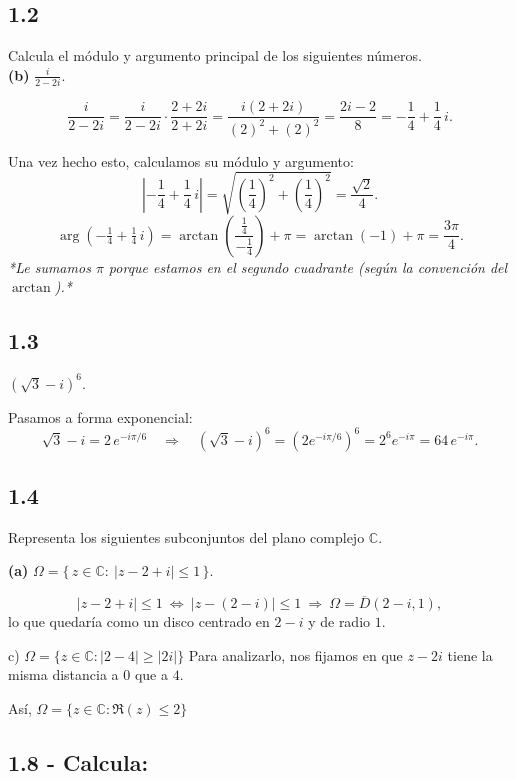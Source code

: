 \documentclass[a4paper,12pt]{article}
\begin{document}
\subsection*{1.2} Calcula el módulo y argumento principal de los siguientes números.\\[2pt]
\noindent\textbf{(b)} \(\displaystyle \frac{i}{2-2i}\).

\[
\frac{i}{2-2i}
=\frac{i}{2-2i}\cdot\frac{2+2i}{2+2i}
=\frac{i(2+2i)}{(2)^{2}+(2)^{2}}
=\frac{2i-2}{8}
=-\frac{1}{4}+\frac{1}{4}\,i .
\]

Una vez hecho esto, calculamos su módulo y argumento:
\[
\left|-\frac14+\frac14\,i\right|
=\sqrt{\left(\frac14\right)^{2}+\left(\frac14\right)^{2}}
=\frac{\sqrt2}{4}.
\]
\[
\arg\!\left(-\tfrac14+\tfrac14\,i\right)
=\arctan\!\left(\frac{\,\tfrac14\,}{-\tfrac14}\right)+\pi
=\arctan(-1)+\pi=\frac{3\pi}{4}.
\]
\emph{*Le sumamos \(\pi\) porque estamos en el segundo cuadrante (según la convención del \(\arctan\)).*}

\subsection*{1.3} \(\displaystyle (\sqrt{3}-i)^{6}\).

Pasamos a forma exponencial:
\[
\sqrt{3}-i=2\,e^{-i\pi/6}
\quad\Longrightarrow\quad
(\sqrt{3}-i)^{6}=(2e^{-i\pi/6})^{6}=2^{6}e^{-i\pi}=64\,e^{-i\pi}.
\]

\subsection*{1.4} Representa los siguientes subconjuntos del plano complejo \(\mathbb{C}\).

\noindent\textbf{(a)} \(\displaystyle \Omega=\{\,z\in\mathbb{C}:\ |z-2+i|\le 1\,\}\).

\[
|z-2+i|\le 1\ \Longleftrightarrow\ |z-(2-i)|\le 1
\ \Longrightarrow\ 
\Omega=\overline{D}(2-i,1),
\]
lo que quedaría como un disco centrado en \(2-i\) y de radio \(1\).

\noindent c) $\Omega = \{ z \in \mathbb{C} : |2 - 4| \geq |2i| \}$  
Para analizarlo, nos fijamos en que $z - 2i$ tiene la misma distancia a $0$ que a $4$.

Así, $\Omega = \{ z \in \mathbb{C} : \Re(z) \leq 2 \}$

\subsection*{1.8 - Calcula:}
\end{document}

